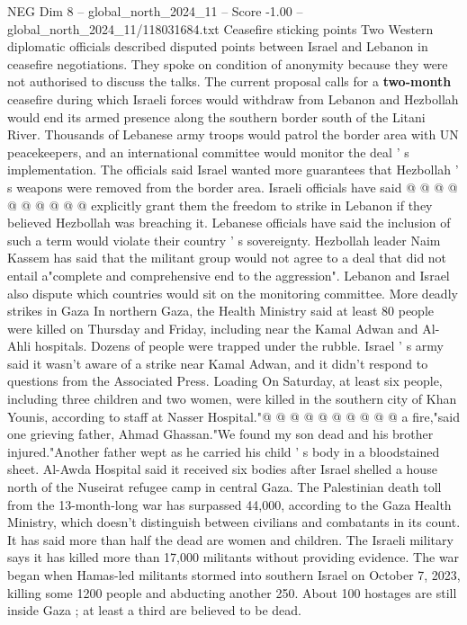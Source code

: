 \begin{textsample}{NEG Dim 8 – global\_north\_2024\_11 – Score -1.00 – global\_north\_2024\_11/118031684.txt}
Ceasefire sticking points Two Western diplomatic officials described disputed points between Israel and Lebanon in ceasefire negotiations.
They spoke on condition of anonymity because they were not authorised to discuss the talks.
The current proposal calls for a \textbf{two-month} ceasefire during which Israeli forces would withdraw from Lebanon and Hezbollah would end its armed presence along the southern border south of the Litani River.
Thousands of Lebanese army troops would patrol the border area with UN peacekeepers, and an international committee would monitor the deal ' s implementation.
The officials said Israel wanted more guarantees that Hezbollah ' s weapons were removed from the border area.
Israeli officials have said @ @ @ @ @ @ @ @ @ @ explicitly grant them the freedom to strike in Lebanon if they believed Hezbollah was breaching it.
Lebanese officials have said the inclusion of such a term would violate their country ' s sovereignty.
Hezbollah leader Naim Kassem has said that the militant group would not agree to a deal that did not entail a"complete and comprehensive end to the aggression".
Lebanon and Israel also dispute which countries would sit on the monitoring committee.
More deadly strikes in Gaza In northern Gaza, the Health Ministry said at least 80 people were killed on Thursday and Friday, including near the Kamal Adwan and Al-Ahli hospitals.
Dozens of people were trapped under the rubble.
Israel ' s army said it wasn't aware of a strike near Kamal Adwan, and it didn't respond to questions from the Associated Press.
Loading On Saturday, at least six people, including three children and two women, were killed in the southern city of Khan Younis, according to staff at Nasser Hospital."@ @ @ @ @ @ @ @ @ @ a fire,"said one grieving father, Ahmad Ghassan."We found my son dead and his brother injured."Another father wept as he carried his child ' s body in a bloodstained sheet.
Al-Awda Hospital said it received six bodies after Israel shelled a house north of the Nuseirat refugee camp in central Gaza.
The Palestinian death toll from the 13-month-long war has surpassed 44,000, according to the Gaza Health Ministry, which doesn't distinguish between civilians and combatants in its count.
It has said more than half the dead are women and children.
The Israeli military says it has killed more than 17,000 militants without providing evidence.
The war began when Hamas-led militants stormed into southern Israel on October 7, 2023, killing some 1200 people and abducting another 250.
About 100 hostages are still inside Gaza ; at least a third are believed to be dead.

\end{textsample}
